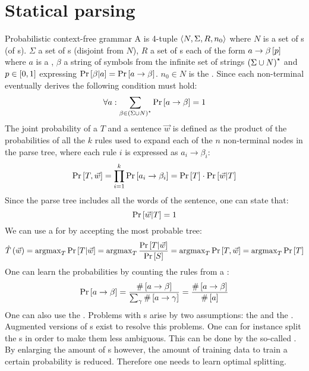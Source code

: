 \section{Statical parsing}
\begin{df}{Probabilistic context-free grammar}
A \sb{} is 4-tuple $\left\langle N,\Sigma,R,n_0\right\rangle$ where $N$ is a set of s (of s). $\Sigma$ a set of s (disjoint from $N$), $R$ a set of s each of the form $a\rightarrow\beta\left[p\right]$ where $a$ is a , $\beta$ a string of symbols from the infinite set of strings $\left(\Sigma\cup N\right)^{\star}$ and $p\in\left[0,1\right]$ expressing $\Pr\left[\beta|a\right]=\Pr\left[a\rightarrow\beta\right]$. $n_0\in N$ is the . Since each non-terminal eventually derives the following condition must hold:
\begin{equation}
\forall a:\displaystyle\sum_{\beta\in\left(\Sigma\cup N\right)^{\star}}\Pr\left[a\rightarrow\beta\right]=1
\end{equation}
The joint probability of a  $T$ and a sentence $\vec{w}$ is defined as the product of the probabilities of all the $k$ rules used to expand each of the $n$ non-terminal nodes in the parse tree, where each rule $i$ is expressed as $a_i\rightarrow\beta_i$:
\begin{equation}
\Pr\left[T,\vec{w}\right]=\displaystyle\prod_{i=1}^{k}{\Pr\left[a_i\rightarrow\beta_i\right]}=\Pr\left[T\right]\cdot\Pr\left[\vec{w}|T\right]
\end{equation}
Since the parse tree includes all the words of the sentence, one can state that:
\begin{equation}
\Pr\left[\vec{w}|T\right]=1
\end{equation}
We can use a \sb{} for  by accepting the most probable tree:
\begin{equation}
\hat{T}\left(\vec{w}\right)=\operatorname{argmax}_T\Pr\left[T|\vec{w}\right]=\operatorname{argmax}_T\displaystyle\frac{\Pr\left[T|\vec{w}\right]}{\Pr\left[S\right]}=\operatorname{argmax}_T\Pr\left[T,\vec{w}\right]=\operatorname{argmax}_T\Pr\left[T\right]
\end{equation}
One can learn the probabilities by counting the rules from a :
\begin{equation}
\Pr\left[a\rightarrow\beta\right]=\displaystyle\frac{\#\left[a\rightarrow\beta\right]}{\sum_{\gamma}\#\left[a\rightarrow\gamma\right]}=\displaystyle\frac{\#\left[a\rightarrow\beta\right]}{\#\left[a\right]}
\end{equation}
One can also use the . Problems with \sb{}s arise by two assumptions: the  and the . Augmented versions of \sb{}s exist to resolve this problems. One can for instance split the s in order to make them less ambiguous. This can be done by the so-called . By enlarging the amount of s however, the amount of training data to train a certain probability is reduced. Therefore one needs to learn optimal splitting.
\end{df}
